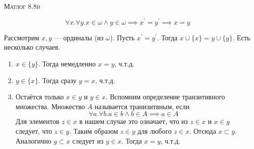 \documentclass[10pt]{article}
\begin{document}
\def\chap#1#2{\ \\ {\large\bf#1 \ | \ \tt\scshape#2} \par}

\ \vspace{-1cm}

{\bf
\ \\
\Large\centerline{\scshape Матлог 8.8b}
}\normalsize

\[\forall x. \forall y. x\in \omega \land y\in \omega \implies x^\prime = y^\prime \implies x = y\]

Рассмотрим $x,y$ --- ординалы (из $\omega$). 
Пусть $x^\prime = y^\prime$. 
Тогда $x \cup \{x\} = y \cup \{y\}$.
Есть несколько случаев.
\begin{enumerate}
    \item $x\in \{y\}$. Тогда немедленно $x = y$, ч.т.д.
    \item $y\in \{x\}$. Тогда сразу $y = x$, ч.т.д.
    \item Остаётся только $x\in y$ и $y\in x$. Вспомним определение транзитивного множества. 
    Множество $A$ называется транизитвным, если 
    \[ \forall a. \forall b. a\in b \land b \in A \implies a\in A \]
    Для элементов $z\in x$ в нашем случае это означает, что из $z \in x$ и $x \in y$ следует, что $z\in y$.
    Таким образом $z\in y$ для любого $z\in x$. 
    Отсюда $x\subset y$.
    Аналогично $y\subset x$ следует из $y\in x$.
    Тогда $x = y$, ч.т.д. 
\end{enumerate}
\end{document}
